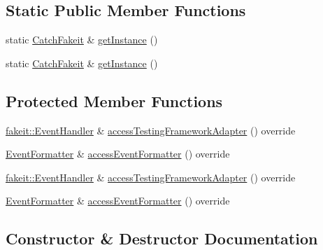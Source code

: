 \subsection*{Static Public Member Functions}
\begin{DoxyCompactItemize}
\item 
static \mbox{\hyperlink{classfakeit_1_1CatchFakeit}{Catch\+Fakeit}} \& \mbox{\hyperlink{classfakeit_1_1CatchFakeit_a1e62f65c45997371254a7c3932dbf968}{get\+Instance}} ()
\item 
static \mbox{\hyperlink{classfakeit_1_1CatchFakeit}{Catch\+Fakeit}} \& \mbox{\hyperlink{classfakeit_1_1CatchFakeit_a1e62f65c45997371254a7c3932dbf968}{get\+Instance}} ()
\end{DoxyCompactItemize}
\subsection*{Protected Member Functions}
\begin{DoxyCompactItemize}
\item 
\mbox{\hyperlink{structfakeit_1_1EventHandler}{fakeit\+::\+Event\+Handler}} \& \mbox{\hyperlink{classfakeit_1_1CatchFakeit_aadcd043eb8a6ded0ff11677b2a414b37}{access\+Testing\+Framework\+Adapter}} () override
\item 
\mbox{\hyperlink{structfakeit_1_1EventFormatter}{Event\+Formatter}} \& \mbox{\hyperlink{classfakeit_1_1CatchFakeit_aaadf534923d2255186e3a13446828b05}{access\+Event\+Formatter}} () override
\item 
\mbox{\hyperlink{structfakeit_1_1EventHandler}{fakeit\+::\+Event\+Handler}} \& \mbox{\hyperlink{classfakeit_1_1CatchFakeit_aadcd043eb8a6ded0ff11677b2a414b37}{access\+Testing\+Framework\+Adapter}} () override
\item 
\mbox{\hyperlink{structfakeit_1_1EventFormatter}{Event\+Formatter}} \& \mbox{\hyperlink{classfakeit_1_1CatchFakeit_aaadf534923d2255186e3a13446828b05}{access\+Event\+Formatter}} () override
\end{DoxyCompactItemize}


\subsection{Constructor \& Destructor Documentation}
\mbox{\label{classfakeit_1_1CatchFakeit_a1cb16b9a46b9e687c65514f14186d2ac}} 
